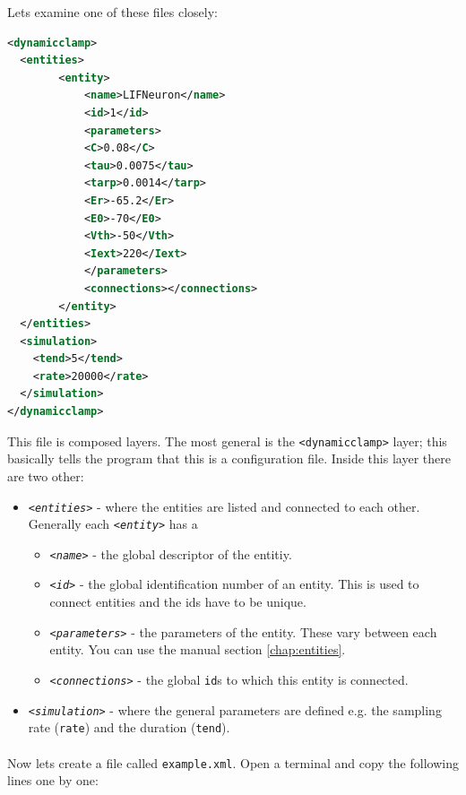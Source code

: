 Lets examine one of these files closely:

\renewcommand{\lstlistingname}{Example}
\begin{lstlisting}[caption={A simple example of a configuration file with a simulated integrate and fire neuron.},label={gettingStarted:example0},language=XML,morekeywords={dynamic clamp,entities,entity,name,id,C,tau,tarp,Er,E0,Vth,Iext,parameters,connections,simulation,tend,rate}]
<dynamicclamp>
  <entities>
    	<entity>
      		<name>LIFNeuron</name>
      		<id>1</id>
      		<parameters>
			<C>0.08</C>
			<tau>0.0075</tau>
			<tarp>0.0014</tarp>
			<Er>-65.2</Er>
			<E0>-70</E0>
			<Vth>-50</Vth>
			<Iext>220</Iext>
      		</parameters>
      		<connections></connections>
    	</entity>
  </entities>
  <simulation>
  	<tend>5</tend>
   	<rate>20000</rate>
  </simulation>
</dynamicclamp>

\end{lstlisting}
 
This file is composed layers. The most general is the \texttt{<dynamicclamp>} layer; this basically tells the program that this is a configuration file. Inside this layer there are two other:
\begin{itemize}
\item
\emph{ \texttt{<entities>}}  - where the entities are listed and connected to each other. Generally each \emph{ \texttt{<entity>}} has a 
	\begin{itemize}
	\item \emph{ \texttt{<name>}} - the global descriptor of the entitiy. 
	\item \emph{ \texttt{<id>}} - the global identification number of an entity. This is used to connect entities and the ids have to be unique.
	\item \emph{ \texttt{<parameters>}} - the parameters of the entity. These vary between each entity. You can use the manual section \ref{chap:entities}.
	\item \emph{ \texttt{<connections>}} - the global \texttt{id}s to which this entity is connected.
	\end{itemize}
\item
\emph{ \texttt{<simulation>}} - where the general parameters are defined e.g. the sampling rate (\texttt{rate}) and the duration (\texttt{tend}).
\end{itemize}

\paragraph{}
Now lets create a file called \texttt{example.xml}. Open a terminal and copy the following lines one by one:

